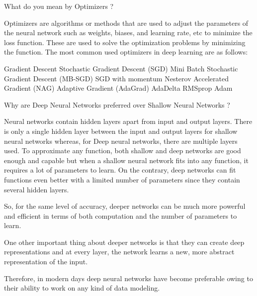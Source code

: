 \documentclass[12pt,a4paper]{exam}
\begin{document}

\question
What do you mean by Optimizers ?
\fillwithlines{3cm}
\begin{solution}
Optimizers are algorithms or methods that are used to adjust the parameters of the neural network such as weights, biases, and learning rate, etc to minimize the loss function. These are used to solve the optimization problems by minimizing the function.
The most common used optimizers in deep learning are as follows:

Gradient Descent
Stochastic Gradient Descent (SGD)
Mini Batch Stochastic Gradient Descent (MB-SGD)
SGD with momentum
Nesterov Accelerated Gradient (NAG)
Adaptive Gradient (AdaGrad)
AdaDelta
RMSprop
Adam
\end{solution}


\question
Why are Deep Neural Networks preferred over Shallow Neural Networks ?
\fillwithlines{3cm}
\begin{solution}
Neural networks contain hidden layers apart from input and output layers. There is only a single hidden layer between the input and output layers for shallow neural networks whereas, for Deep neural networks, there are multiple layers used.
To approximate any function, both shallow and deep networks are good enough and capable but when a shallow neural network fits into any function, it requires a lot of parameters to learn. On the contrary, deep networks can fit functions even better with a limited number of parameters since they contain several hidden layers.

So, for the same level of accuracy, deeper networks can be much more powerful and efficient in terms of both computation and the number of parameters to learn.

One other important thing about deeper networks is that they can create deep representations and at every layer, the network learns a new, more abstract representation of the input.

Therefore, in modern days deep neural networks have become preferable owing to their ability to work on any kind of data modeling.
\end{solution}
\end{document}
